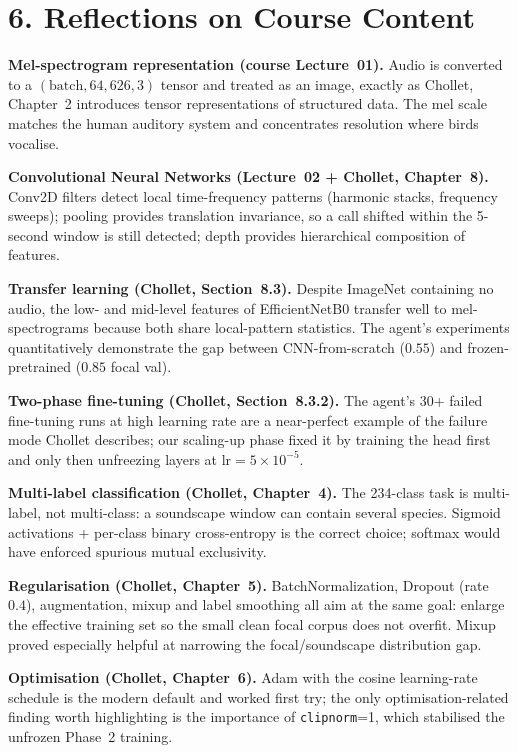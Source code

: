 \documentclass[11pt,a4paper]{article}
\begin{document}
\section*{6. Reflections on Course Content}

\textbf{Mel-spectrogram representation (course Lecture~01).} Audio is converted to a $(\text{batch}, 64, 626, 3)$ tensor and treated as an image, exactly as Chollet, Chapter~2 introduces tensor representations of structured data. The mel scale matches the human auditory system and concentrates resolution where birds vocalise.

\textbf{Convolutional Neural Networks (Lecture~02 + Chollet, Chapter~8).} Conv2D filters detect local time-frequency patterns (harmonic stacks, frequency sweeps); pooling provides translation invariance, so a call shifted within the 5-second window is still detected; depth provides hierarchical composition of features.

\textbf{Transfer learning (Chollet, Section~8.3).} Despite ImageNet containing no audio, the low- and mid-level features of EfficientNetB0 transfer well to mel-spectrograms because both share local-pattern statistics. The agent's experiments quantitatively demonstrate the gap between CNN-from-scratch ($0.55$) and frozen-pretrained ($0.85$ focal val).

\textbf{Two-phase fine-tuning (Chollet, Section~8.3.2).} The agent's 30+ failed fine-tuning runs at high learning rate are a near-perfect example of the failure mode Chollet describes; our scaling-up phase fixed it by training the head first and only then unfreezing layers at $\text{lr}=5\times 10^{-5}$.

\textbf{Multi-label classification (Chollet, Chapter~4).} The 234-class task is multi-label, not multi-class: a soundscape window can contain several species. Sigmoid activations + per-class binary cross-entropy is the correct choice; softmax would have enforced spurious mutual exclusivity.

\textbf{Regularisation (Chollet, Chapter~5).} BatchNormalization, Dropout (rate~$0.4$), augmentation, mixup and label smoothing all aim at the same goal: enlarge the effective training set so the small clean focal corpus does not overfit. Mixup proved especially helpful at narrowing the focal/soundscape distribution gap.

\textbf{Optimisation (Chollet, Chapter~6).} Adam with the cosine learning-rate schedule is the modern default and worked first try; the only optimisation-related finding worth highlighting is the importance of \texttt{clipnorm}=1, which stabilised the unfrozen Phase~2 training.
\end{document}
